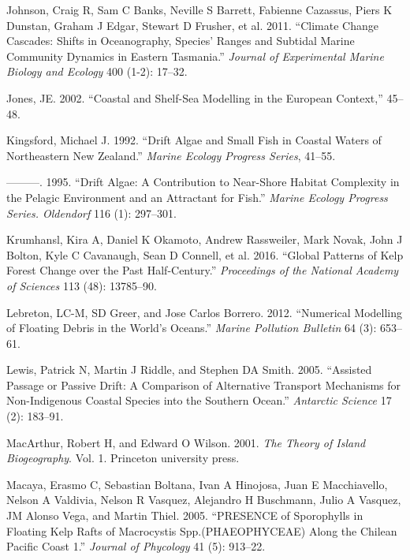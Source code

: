 \documentclass[
]{article}
\begin{document}
\leavevmode\hypertarget{ref-Johnson2011}{}%
Johnson, Craig R, Sam C Banks, Neville S Barrett, Fabienne Cazassus,
Piers K Dunstan, Graham J Edgar, Stewart D Frusher, et al. 2011.
``Climate Change Cascades: Shifts in Oceanography, Species' Ranges and
Subtidal Marine Community Dynamics in Eastern Tasmania.'' \emph{Journal
of Experimental Marine Biology and Ecology} 400 (1-2): 17--32.

\leavevmode\hypertarget{ref-Jones2002}{}%
Jones, JE. 2002. ``Coastal and Shelf-Sea Modelling in the European
Context,'' 45--48.

\leavevmode\hypertarget{ref-kingsford1992}{}%
Kingsford, Michael J. 1992. ``Drift Algae and Small Fish in Coastal
Waters of Northeastern New Zealand.'' \emph{Marine Ecology Progress
Series}, 41--55.

\leavevmode\hypertarget{ref-kingsford1995}{}%
---------. 1995. ``Drift Algae: A Contribution to Near-Shore Habitat
Complexity in the Pelagic Environment and an Attractant for Fish.''
\emph{Marine Ecology Progress Series. Oldendorf} 116 (1): 297--301.

\leavevmode\hypertarget{ref-Krumhansl2016}{}%
Krumhansl, Kira A, Daniel K Okamoto, Andrew Rassweiler, Mark Novak, John
J Bolton, Kyle C Cavanaugh, Sean D Connell, et al. 2016. ``Global
Patterns of Kelp Forest Change over the Past Half-Century.''
\emph{Proceedings of the National Academy of Sciences} 113 (48):
13785--90.

\leavevmode\hypertarget{ref-lebreton2012}{}%
Lebreton, LC-M, SD Greer, and Jose Carlos Borrero. 2012. ``Numerical
Modelling of Floating Debris in the World's Oceans.'' \emph{Marine
Pollution Bulletin} 64 (3): 653--61.

\leavevmode\hypertarget{ref-lewis2005}{}%
Lewis, Patrick N, Martin J Riddle, and Stephen DA Smith. 2005.
``Assisted Passage or Passive Drift: A Comparison of Alternative
Transport Mechanisms for Non-Indigenous Coastal Species into the
Southern Ocean.'' \emph{Antarctic Science} 17 (2): 183--91.

\leavevmode\hypertarget{ref-macarthur2001}{}%
MacArthur, Robert H, and Edward O Wilson. 2001. \emph{The Theory of
Island Biogeography}. Vol. 1. Princeton university press.

\leavevmode\hypertarget{ref-macaya2005}{}%
Macaya, Erasmo C, Sebastian Boltana, Ivan A Hinojosa, Juan E
Macchiavello, Nelson A Valdivia, Nelson R Vasquez, Alejandro H
Buschmann, Julio A Vasquez, JM Alonso Vega, and Martin Thiel. 2005.
``PRESENCE of Sporophylls in Floating Kelp Rafts of Macrocystis
Spp.(PHAEOPHYCEAE) Along the Chilean Pacific Coast 1.'' \emph{Journal of
Phycology} 41 (5): 913--22.
\end{document}
